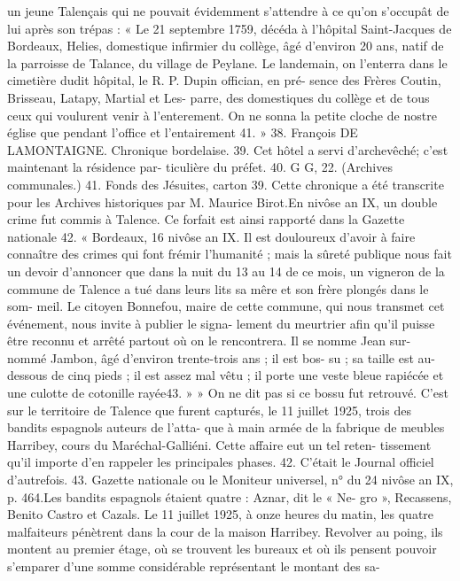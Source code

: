 \documentclass[a4paper,11pt]{book}
\begin{document}
un jeune Talençais qui ne pouvait évidemment s'attendre
à ce qu'on s'occupât de lui après son trépas :
« Le 21 septembre 1759, décéda à l'hôpital Saint-Jacques
de Bordeaux, Helies, domestique infirmier du collège,
âgé d'environ 20 ans, natif de la parroisse de Talance, du
village de Peylane. Le landemain, on l'enterra dans le
cimetière dudit hôpital, le R. P. Dupin offician, en pré-
sence des Frères Coutin, Brisseau, Latapy, Martial et Les-
parre, des domestiques du collège et de tous ceux qui
voulurent venir à l'enterement. On ne sonna la petite cloche
de nostre église que pendant l'office et l'entairement 41. »
38. François DE LAMONTAIGNE. Chronique bordelaise.
39. Cet hôtel a servi d'archevêché; c'est maintenant la résidence par-
ticulière du préfet.
40. G G, 22. (Archives communales.)
41. Fonds des Jésuites, carton 39. Cette chronique a été transcrite
pour les Archives historiques par M. Maurice Birot.En nivôse an IX, un double crime fut commis à Talence.
Ce forfait est ainsi rapporté dans la Gazette nationale 42.
« Bordeaux,
16 nivôse an IX.
Il est douloureux d'avoir à faire connaître des crimes
qui font frémir l'humanité ; mais la sûreté publique nous
fait un devoir d'annoncer que dans la nuit du 13 au 14
de ce mois, un vigneron de la commune de Talence a tué
dans leurs lits sa mêre et son frère plongés dans le som-
meil. Le citoyen Bonnefou, maire de cette commune, qui
nous transmet cet événement, nous invite à publier le signa-
lement du meurtrier afin qu'il puisse être reconnu et
arrêté partout où on le rencontrera. Il se nomme Jean sur-
nommé Jambon, âgé d'environ trente-trois ans ; il est bos-
su ; sa taille est au-dessous de cinq pieds ; il est assez mal
vêtu ; il porte une veste bleue rapiécée et une culotte de
cotonille rayée43. »
»
On ne dit pas si ce bossu fut retrouvé.
C'est sur le territoire de Talence que furent capturés, le
11 juillet 1925, trois des bandits espagnols auteurs de l'atta-
que à main armée de la fabrique de meubles Harribey,
cours du Maréchal-Galliéni. Cette affaire eut un tel reten-
tissement qu'il importe d'en rappeler les principales phases.
42. C'était le Journal officiel d'autrefois.
43. Gazette nationale ou le Moniteur universel, n° du 24 nivôse an IX,
p. 464.Les bandits espagnols étaient quatre : Aznar, dit le « Ne-
gro », Recassens, Benito Castro et Cazals.
Le 11 juillet 1925, à onze heures du matin, les quatre
malfaiteurs pénètrent dans la cour de la maison Harribey.
Revolver au poing, ils montent au premier étage, où se
trouvent les bureaux et où ils pensent pouvoir s'emparer
d'une somme considérable représentant le montant des sa-
\end{document}
